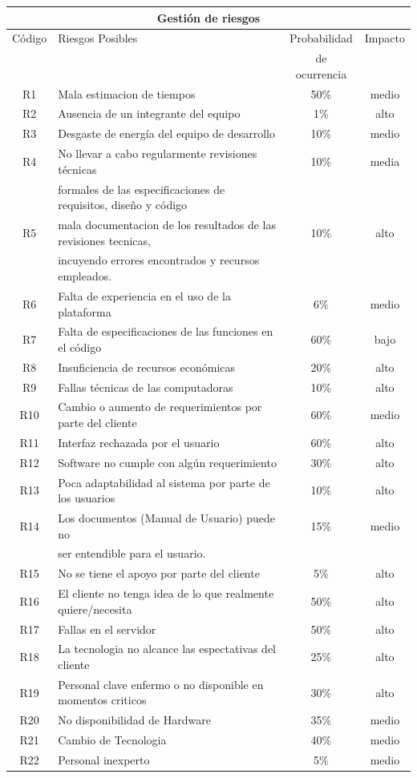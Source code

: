 \documentclass[11pt,letterpaper]{report}
\begin{document}
\begin{tabular}{|c|l|c|c|}
	\hline
	\multicolumn{4}{|c|}{Gestión de riesgos}\\ \hline
	Código & Riesgos Posibles & Probabilidad & Impacto \\ 
	& & de ocurrencia & \\ \hline
	R1 & Mala estimacion de tiempos  & 50\% & medio \\ \hline
	R2 & Ausencia de un integrante del equipo & 1\% & alto \\ \hline
	R3 & Desgaste de energía del equipo de desarrollo & 10\% & medio  \\ \hline
	R4 & No llevar a cabo regularmente revisiones técnicas  & 10\% & media \\ 
	& formales de las especificaciones de requisitos, diseño y código & & \\ \hline
	R5 & mala documentacion de los resultados de las revisiones tecnicas,  & 10\% & alto \\ 
	& incuyendo errores encontrados y recursos empleados. && \\ \hline
	R6 & Falta de experiencia en el uso de la plataforma & 6\% & medio \\ \hline
	R7 & Falta de especificaciones de las funciones en el código & 60\% & bajo \\ \hline
	R8 & Insuficiencia de recursos económicas & 20\% & alto \\ \hline
	R9 & Fallas técnicas de las computadoras & 10\% & alto \\ \hline
	R10 & Cambio o aumento de requerimientos por parte del cliente & 60\% & medio \\ \hline
	R11 & Interfaz rechazada por el usuario & 60\% & alto \\ \hline
	R12 & Software no cumple con algún requerimiento & 30\% & alto \\ \hline
	R13 & Poca adaptabilidad al sistema por parte de los usuarios & 10\% & alto  \\ \hline
	R14 & Los documentos (Manual de Usuario) puede no  & 15\% & medio \\ 
	& ser entendible para el usuario. && \\ \hline
	R15 & No se tiene el apoyo por parte del cliente & 5\% & alto \\ \hline
	R16 & El cliente no tenga idea de lo que realmente quiere/necesita & 50\% & alto \\ \hline
	R17 & Fallas en el servidor & 50\% & alto \\ \hline
	R18 & La tecnologia no alcance las espectativas del cliente & 25\% & alto \\ \hline
	R19 & Personal clave enfermo o no disponible en momentos criticos & 30\% & alto \\ \hline
	R20 & No disponibilidad de Hardware & 35\% & medio \\ \hline
	R21 & Cambio de Tecnologia & 40\% & medio \\ \hline
	R22 & Personal inexperto & 5\% & medio \\ \hline
\end{tabular}
\end{document}

